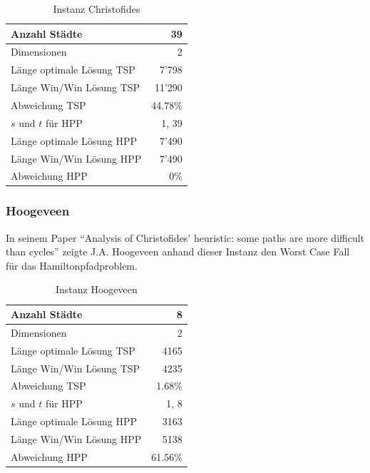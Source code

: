 \documentclass[11pt,a4paper]{article}
\begin{document}
        \begin{table}[H]
                \centering
                \begin{tabular}{| l | r |}
                    \hline
                        Anzahl Städte               & 39            \\ \hline
                        Dimensionen                 & 2             \\ \hline
                        Länge optimale Lösung TSP   & 7'798         \\ \hline
                        Länge Win/Win Lösung  TSP   & 11'290        \\ \hline
                        Abweichung TSP              & 44.78\%       \\ \hline
                        $s$ und $t$ für HPP         & 1, 39         \\ \hline
                        Länge optimale Lösung HPP   & 7'490         \\ \hline
                        Länge Win/Win Lösung  HPP   & 7'490         \\ \hline
                        Abweichung HPP              & 0\%           \\ \hline
                \end{tabular}
                \caption{Instanz Christofides}
                \label{tab:instanz_christofides}
        \end{table}

\subsubsection{Hoogeveen}
In seinem Paper "`Analysis of Christofides' heuristic: some paths are more difficult than cycles"'\cite{hoogeveen91} zeigte J.A. Hoogeveen anhand dieser Instanz den Worst Case Fall für das Hamiltonpfadproblem.

\begin{table}[H]
        \centering
        \begin{tabular}{| l | r |}
            \hline
                Anzahl Städte               & 8             \\ \hline
                Dimensionen                 & 2             \\ \hline
                Länge optimale Lösung TSP   & 4165          \\ \hline
                Länge Win/Win Lösung  TSP   & 4235          \\ \hline
                Abweichung TSP              & 1.68\%        \\ \hline
                $s$ und $t$ für HPP         & 1, 8          \\ \hline
                Länge optimale Lösung HPP   & 3163          \\ \hline
                Länge Win/Win Lösung  HPP   & 5138          \\ \hline
                Abweichung HPP              & 61.56\%       \\ \hline
        \end{tabular}
        \caption{Instanz Hoogeveen}
        \label{tab:instanz_hoogeveen}
\end{table}
\end{document}
